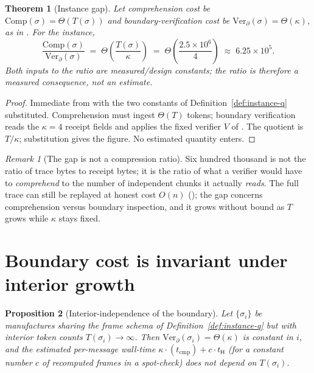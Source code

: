 \documentclass[11pt,oneside]{book}
\theoremstyle{definition}
\theoremstyle{plain}
\newtheorem{theorem}{Theorem}[chapter]
\newtheorem{proposition}[theorem]{Proposition}
\theoremstyle{remark}
\newtheorem*{remark}{Remark}
\newcommand{\chainH}{\mathsf{H}}               %
\newcommand{\CL}{\kappa}                       %
\begin{document}
\begin{theorem}[Instance gap]\label{thm:instance-gap}
Let comprehension cost be $\mathrm{Comp}(\sigma)=\Theta(T(\sigma))$ and boundary-verification
cost be $\mathrm{Ver}_\partial(\sigma)=\Theta(\CL)$, as in \cite[Thm.~4.2]{keystone}. For the
instance,
\[
\frac{\mathrm{Comp}(\sigma)}{\mathrm{Ver}_\partial(\sigma)}
\;=\;\Theta\!\left(\frac{T(\sigma)}{\CL}\right)
\;=\;\Theta\!\left(\frac{2.5\times 10^{6}}{4}\right)
\;\approx\;6.25\times 10^{5}.
\]
Both inputs to the ratio are measured/design constants; the ratio is therefore a measured
consequence, not an estimate.
\end{theorem}

\begin{proof}
Immediate from \cite[Thm.~4.2]{keystone} with the two constants of Definition~\ref{def:instance-q}
substituted. Comprehension must ingest $\Theta(T)$ tokens; boundary verification reads the
$\CL=4$ receipt fields and applies the fixed verifier $V$ of \cite[Cor.~3.3]{keystone}. The
quotient is $T/\CL$; substitution gives the figure. No estimated quantity enters.
\end{proof}

\begin{remark}[The gap is not a compression ratio]
Six hundred thousand is not the ratio of trace bytes to receipt bytes; it is the ratio of what a
verifier would have to \emph{comprehend} to the number of independent chunks it actually
\emph{reads}. The full trace can still be replayed at honest cost $O(n)$
(\cite[Def.~4.1]{keystone}); the gap concerns comprehension versus boundary inspection, and it
grows without bound as $T$ grows while $\CL$ stays fixed.
\end{remark}

\section{Boundary cost is invariant under interior growth}

\begin{proposition}[Interior-independence of the boundary]\label{prop:invariance}
Let $\{\sigma_i\}$ be manufactures sharing the frame schema of Definition~\ref{def:instance-q}
but with interior token counts $T(\sigma_i)\to\infty$. Then $\mathrm{Ver}_\partial(\sigma_i)=
\Theta(\CL)$ is constant in $i$, and the estimated per-message wall-time
$\CL\cdot(t_{\text{cmp}}) + c\cdot t_{\chainH}$ (for a constant number $c$ of recomputed frames
in a spot-check) does not depend on $T(\sigma_i)$.
\end{proposition}
\end{document}
